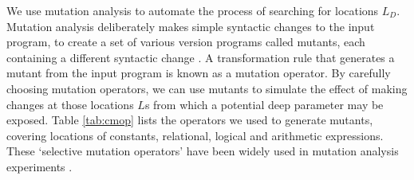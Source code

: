We use mutation analysis to automate the process of searching for locations
$L_D$. Mutation analysis deliberately makes simple syntactic changes to the
input program, to create a set of various version programs called mutants,
each containing a different syntactic change \cite{5487526}. A
transformation rule that generates a mutant from the input program is known
as a mutation operator. By carefully choosing mutation operators, we can
use mutants to simulate the effect of making changes at those locations $L$s
from which a potential deep parameter may be exposed. 
Table \ref{tab:cmop} lists the operators we used to generate
mutants, covering locations of constants, relational, logical and
arithmetic expressions. 
These `selective mutation operators'
have been widely used in mutation analysis experiments \cite{5487526}.

